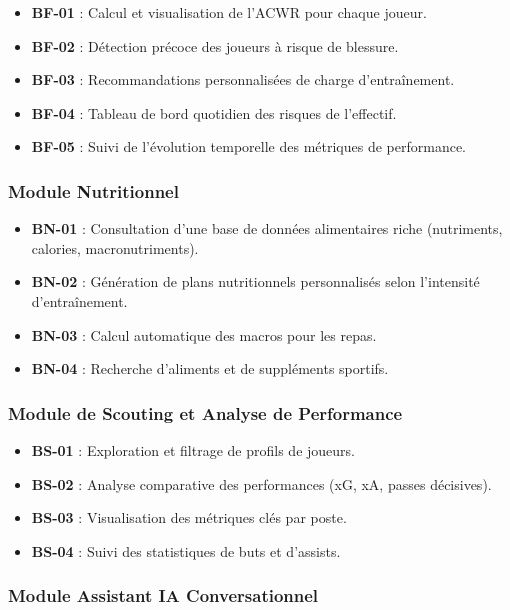 \begin{itemize}
    \item \textbf{BF-01} : Calcul et visualisation de l'ACWR pour chaque joueur.
    \item \textbf{BF-02} : Détection précoce des joueurs à risque de blessure.
    \item \textbf{BF-03} : Recommandations personnalisées de charge d'entraînement.
    \item \textbf{BF-04} : Tableau de bord quotidien des risques de l'effectif.
    \item \textbf{BF-05} : Suivi de l'évolution temporelle des métriques de performance.
\end{itemize}

\subsubsection{Module Nutritionnel}

\begin{itemize}
    \item \textbf{BN-01} : Consultation d'une base de données alimentaires riche (nutriments, calories, macronutriments).
    \item \textbf{BN-02} : Génération de plans nutritionnels personnalisés selon l'intensité d'entraînement.
    \item \textbf{BN-03} : Calcul automatique des macros pour les repas.
    \item \textbf{BN-04} : Recherche d'aliments et de suppléments sportifs.
\end{itemize}

\subsubsection{Module de Scouting et Analyse de Performance}

\begin{itemize}
    \item \textbf{BS-01} : Exploration et filtrage de profils de joueurs.
    \item \textbf{BS-02} : Analyse comparative des performances (xG, xA, passes décisives).
    \item \textbf{BS-03} : Visualisation des métriques clés par poste.
    \item \textbf{BS-04} : Suivi des statistiques de buts et d'assists.
\end{itemize}

\subsubsection{Module Assistant IA Conversationnel}

